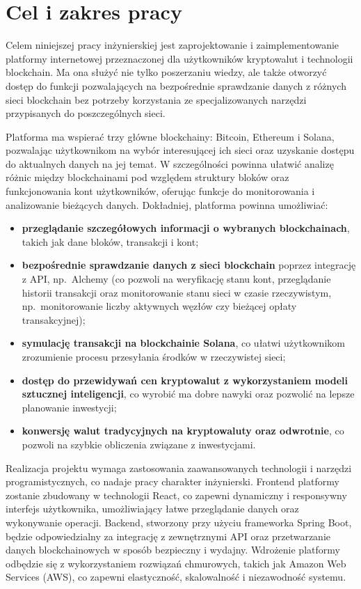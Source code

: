 \section{Cel i zakres pracy}
Celem niniejszej pracy inżynierskiej jest zaprojektowanie i zaimplementowanie platformy internetowej przeznaczonej dla użytkowników kryptowalut i technologii blockchain. Ma ona służyć nie tylko poszerzaniu wiedzy, ale także otworzyć dostęp do funkcji pozwalających na bezpośrednie sprawdzanie danych z różnych sieci blockchain bez potrzeby korzystania ze specjalizowanych narzędzi przypisanych do poszczególnych sieci.

Platforma ma wspierać trzy główne blockchainy: Bitcoin, Ethereum i Solana, pozwalając użytkownikom na wybór interesującej ich sieci oraz uzyskanie dostępu do aktualnych danych na jej temat. W szczególności powinna ułatwić analizę różnic między blockchainami pod względem struktury bloków oraz funkcjonowania kont użytkowników, oferując funkcje do monitorowania i analizowanie bieżących danych. Dokładniej, platforma powinna umożliwiać:
\begin{itemize}
\item \textbf{przeglądanie szczegółowych informacji o wybranych blockchainach}, takich jak dane bloków, transakcji i kont; 
\item \textbf{bezpośrednie sprawdzanie danych z sieci blockchain} poprzez integrację z API, np.\ Alchemy (co pozwoli na weryfikację stanu kont, przeglądanie historii transakcji oraz monitorowanie stanu sieci  w czasie rzeczywistym, np.\ monitorowanie liczby aktywnych węzłów czy bieżącej opłaty transakcyjnej);
\item \textbf{symulację transakcji na blockchainie Solana}, co ułatwi użytkownikom zrozumienie procesu przesyłania środków w rzeczywistej sieci;
\item \textbf{dostęp do przewidywań cen kryptowalut z wykorzystaniem modeli sztucznej inteligencji}, co wyrobić ma dobre nawyki oraz pozwolić na lepsze planowanie inwestycji;
\item \textbf{konwersję walut tradycyjnych na kryptowaluty oraz odwrotnie}, co pozwoli na szybkie obliczenia związane z inwestycjami. 
\end{itemize}

Realizacja projektu wymaga zastosowania zaawansowanych technologii i narzędzi programistycznych, co nadaje pracy charakter inżynierski. Frontend platformy zostanie zbudowany w technologii React, co zapewni dynamiczny i responsywny interfejs użytkownika, umożliwiający łatwe przeglądanie danych oraz wykonywanie operacji. Backend, stworzony przy użyciu frameworka Spring Boot, będzie odpowiedzialny za integrację z zewnętrznymi API oraz przetwarzanie danych blockchainowych w sposób bezpieczny i wydajny. Wdrożenie platformy odbędzie się z wykorzystaniem rozwiązań chmurowych, takich jak Amazon Web Services (AWS), co zapewni elastyczność, skalowalność i niezawodność systemu.

